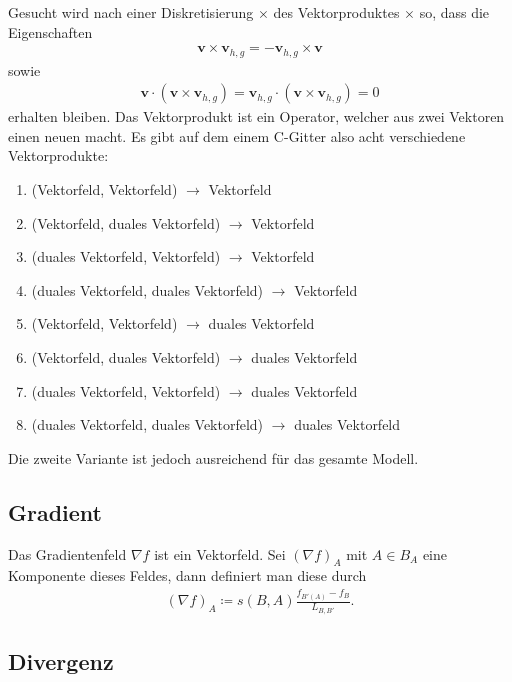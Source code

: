 \documentclass{book}
\begin{document}
Gesucht wird nach einer Diskretisierung $\times$ des Vektorproduktes $\times$ so, dass die Eigenschaften
%
\begin{eqnarray}
\mathbf{v}\times\mathbf{v}_{h, g} = -\mathbf{v}_{h, g}\times\mathbf{v}
\end{eqnarray}
%
sowie
%
\begin{eqnarray}
\mathbf{v}\cdot\left(\mathbf{v}\times\mathbf{v}_{h, g}\right) = \mathbf{v}_{h, g}\cdot\left(\mathbf{v}\times\mathbf{v}_{h, g}\right) = 0
\end{eqnarray}
%
erhalten bleiben. Das Vektorprodukt ist ein Operator, welcher aus zwei Vektoren einen neuen macht. Es gibt auf dem einem C-Gitter also acht verschiedene Vektorprodukte:
%
\begin{enumerate}
\item (Vektorfeld, Vektorfeld) $\rightarrow$ Vektorfeld
\item (Vektorfeld, duales Vektorfeld) $\rightarrow$ Vektorfeld
\item (duales Vektorfeld, Vektorfeld) $\rightarrow$ Vektorfeld
\item (duales Vektorfeld, duales Vektorfeld) $\rightarrow$ Vektorfeld
\item (Vektorfeld, Vektorfeld) $\rightarrow$ duales Vektorfeld
\item (Vektorfeld, duales Vektorfeld) $\rightarrow$ duales Vektorfeld
\item (duales Vektorfeld, Vektorfeld) $\rightarrow$ duales Vektorfeld
\item (duales Vektorfeld, duales Vektorfeld) $\rightarrow$ duales Vektorfeld
\end{enumerate}
%
Die zweite Variante ist jedoch ausreichend für das gesamte Modell.

\subsection{Gradient}
\label{sec:gradient}

Das Gradientenfeld $\nabla f$ ist ein Vektorfeld. Sei $\left(\nabla f\right)_{A}$ mit $A\in B_A$ eine Komponente dieses Feldes, dann definiert man diese durch
%
\begin{eqnarray}
\left(\nabla f\right)_{A} \coloneqq s\left(B, A\right)\frac{f_{B'\left(A\right)} - f_{B}}{L_{B, B'}}.
\end{eqnarray}
%
\subsection{Divergenz}
\label{sec:divergenz_dynamischer_kern}
\end{document}
